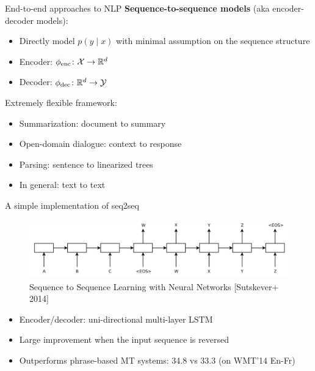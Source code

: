 \documentclass[usenames,dvipsnames,11pt,aspectratio=169]{beamer}
\begin{document}
\begin{frame}
    {End-to-end approaches to NLP}
    \textbf{Sequence-to-sequence models} (aka encoder-decoder models):\\
    \begin{itemize}
        \item Directly model $p(y\mid x)$ with minimal assumption on the sequence structure
        \item Encoder: $\phi_{\text{enc}}\colon \mathcal{X} \rightarrow \mathbb{R}^d$
        \item Decoder: $\phi_{\text{dec}}\colon \mathbb{R}^d \rightarrow \mathcal{Y}$ 
    \end{itemize}

    Extremely flexible framework:\\
    \begin{itemize}
        \item Summarization: document to summary
        \item Open-domain dialogue: context to response
        \item Parsing: sentence to linearized trees
        \item In general: text to text
    \end{itemize}
\end{frame}

\begin{frame}
    {A simple implementation of seq2seq}
    \begin{figure}
        \includegraphics[height=2.5cm]{figures/s2s-ilya}
        \caption{Sequence to Sequence Learning with Neural Networks [Sutskever+ 2014]}
    \end{figure}
    \begin{itemize}
        \item Encoder/decoder: uni-directional multi-layer LSTM
        \item Large improvement when the input sequence is reversed
        \item Outperforms phrase-based MT systems: 34.8 vs 33.3 (on WMT'14 En-Fr) 
    \end{itemize}
\end{frame}
\end{document}
